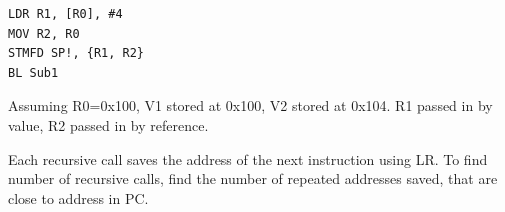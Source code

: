 \documentclass[../comorg-part1.tex]{subfiles}
\begin{document}
\vspace{1em}
\begin{verbatim}
LDR R1, [R0], #4
MOV R2, R0
STMFD SP!, {R1, R2}
BL Sub1
\end{verbatim}
Assuming R0=0x100, V1 stored at 0x100, V2 stored at 0x104.\newline
R1 passed in by value, R2 passed in by reference.\newline

\vspace{1em}

\noindent Each recursive call saves the address of the next instruction using LR.
To find number of recursive calls, find the number of repeated addresses saved, that are close to address in PC.




\end{document}

